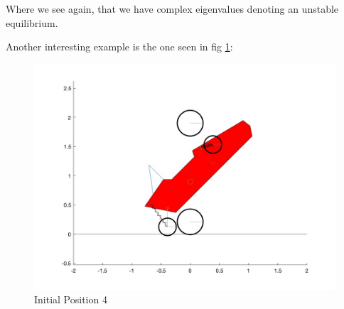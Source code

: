 Where we see again, that we have complex eigenvalues denoting an unstable equilibrium.



\clearpage %
Another interesting example is the one seen in fig \ref{fig:init_4}:



\begin{figure}[ht]
    \centering
    \includegraphics[scale=0.235]{images/q_init_4.jpg}
    \caption{Initial Position 4}
    \label{fig:init_4}
\end{figure}

